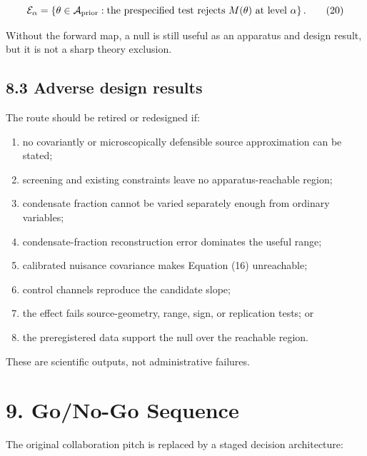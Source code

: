 \documentclass[
  american,
  11pt,
  letterpaper,
]{article}
\providecommand{\tightlist}{%
  \setlength{\itemsep}{0pt}\setlength{\parskip}{0pt}}
\begin{document}
\begin{equation}
\mathcal E_\alpha
=\left\{\theta\in\mathcal A_{\rm prior}:
\text{the prespecified test rejects }M(\theta)
\text{ at level }\alpha\right\}.
\tag{20}
\end{equation}

Without the forward map, a null is still useful as an apparatus and design result, but it is not a sharp theory exclusion.

\subsection{8.3 Adverse design results}\label{adverse-design-results}

The route should be retired or redesigned if:

\begin{enumerate}
\def\labelenumi{\arabic{enumi}.}
\tightlist
\item
  no covariantly or microscopically defensible source approximation can be stated;
\item
  screening and existing constraints leave no apparatus-reachable region;
\item
  condensate fraction cannot be varied separately enough from ordinary variables;
\item
  condensate-fraction reconstruction error dominates the useful range;
\item
  calibrated nuisance covariance makes Equation (16) unreachable;
\item
  control channels reproduce the candidate slope;
\item
  the effect fails source-geometry, range, sign, or replication tests; or
\item
  the preregistered data support the null over the reachable region.
\end{enumerate}

These are scientific outputs, not administrative failures.

\section{9. Go/No-Go Sequence}\label{gono-go-sequence}

The original collaboration pitch is replaced by a staged decision architecture:
\end{document}
